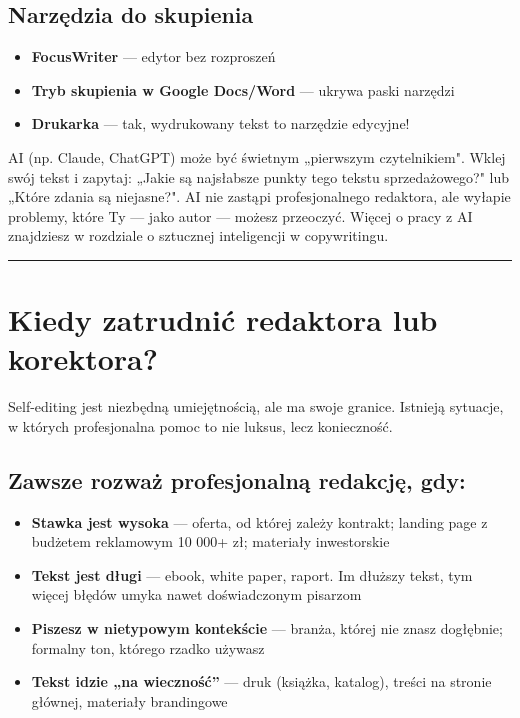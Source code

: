 \documentclass[
  12pt,
  a4paper,
  twoside,
  openright,
  12pt,
  DIV=12,
  BCOR=12mm]{scrbook}
\providecommand{\tightlist}{%
  \setlength{\itemsep}{0pt}\setlength{\parskip}{0pt}}\usepackage{longtable,booktabs,array}
\newcommand{\decoline}{%
  \begin{center}
    \textcolor{bordergray}{\rule{0.3\textwidth}{0.5pt}}
  \end{center}
}
\begin{document}
\subsection{Narzędzia do skupienia}\label{narzux119dzia-do-skupienia}

\begin{itemize}
\tightlist
\item
  \textbf{FocusWriter} --- edytor bez rozproszeń
\item
  \textbf{Tryb skupienia w Google Docs/Word} --- ukrywa paski narzędzi
\item
  \textbf{Drukarka} --- tak, wydrukowany tekst to narzędzie edycyjne!
\end{itemize}

\begin{wskazowka}
AI (np. Claude, ChatGPT) może być świetnym „pierwszym czytelnikiem". Wklej swój tekst i zapytaj: „Jakie są najsłabsze punkty tego tekstu sprzedażowego?" lub „Które zdania są niejasne?". AI nie zastąpi profesjonalnego redaktora, ale wyłapie problemy, które Ty --- jako autor --- możesz przeoczyć. Więcej o pracy z AI znajdziesz w rozdziale o sztucznej inteligencji w copywritingu.
\end{wskazowka}

\decoline

\section{Kiedy zatrudnić redaktora lub
korektora?}\label{kiedy-zatrudniux107-redaktora-lub-korektora}

Self-editing jest niezbędną umiejętnością, ale ma swoje granice.
Istnieją sytuacje, w których profesjonalna pomoc to nie luksus, lecz
konieczność.

\subsection{Zawsze rozważ profesjonalną redakcję,
gdy:}\label{zawsze-rozwaux17c-profesjonalnux105-redakcjux119-gdy}

\begin{itemize}
\tightlist
\item
  \textbf{Stawka jest wysoka} --- oferta, od której zależy kontrakt;
  landing page z budżetem reklamowym 10 000+ zł; materiały inwestorskie
\item
  \textbf{Tekst jest długi} --- ebook, white paper, raport. Im dłuższy
  tekst, tym więcej błędów umyka nawet doświadczonym pisarzom
\item
  \textbf{Piszesz w nietypowym kontekście} --- branża, której nie znasz
  dogłębnie; formalny ton, którego rzadko używasz
\item
  \textbf{Tekst idzie „na wieczność''} --- druk (książka, katalog),
  treści na stronie głównej, materiały brandingowe
\end{itemize}
\end{document}
